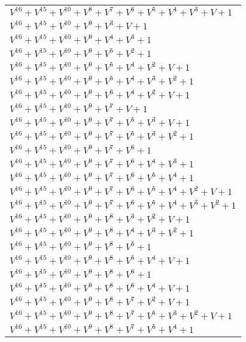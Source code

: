 \documentclass[12pt]{article}
\begin{document}
\begin{adjustwidth}{-4cm}{}
\begin{center}
\begin{longtable}{|l|}
$V^{16}  +V^{15}  +V^{10}  +V^{8}  +V^{7}  +V^{6}  +V^{5}  +V^{4}  +V^{3}  + V + 1$ \\
$V^{16}  +V^{15}  +V^{10}  +V^{9}  +V^{3}  + V + 1$ \\
$V^{16}  +V^{15}  +V^{10}  +V^{9}  +V^{4}  +V^{3}  + 1$ \\
$V^{16}  +V^{15}  +V^{10}  +V^{9}  +V^{5}  +V^{2}  + 1$ \\
$V^{16}  +V^{15}  +V^{10}  +V^{9}  +V^{5}  +V^{4}  +V^{2}  + V + 1$ \\
$V^{16}  +V^{15}  +V^{10}  +V^{9}  +V^{5}  +V^{4}  +V^{3}  +V^{2}  + 1$ \\
$V^{16}  +V^{15}  +V^{10}  +V^{9}  +V^{6}  +V^{4}  +V^{2}  + V + 1$ \\
$V^{16}  +V^{15}  +V^{10}  +V^{9}  +V^{7}  + V + 1$ \\
$V^{16}  +V^{15}  +V^{10}  +V^{9}  +V^{7}  +V^{5}  +V^{3}  + V + 1$ \\
$V^{16}  +V^{15}  +V^{10}  +V^{9}  +V^{7}  +V^{5}  +V^{3}  +V^{2}  + 1$ \\
$V^{16}  +V^{15}  +V^{10}  +V^{9}  +V^{7}  +V^{6}  + 1$ \\
$V^{16}  +V^{15}  +V^{10}  +V^{9}  +V^{7}  +V^{6}  +V^{4}  +V^{3}  + 1$ \\
$V^{16}  +V^{15}  +V^{10}  +V^{9}  +V^{7}  +V^{6}  +V^{5}  +V^{4}  + 1$ \\
$V^{16}  +V^{15}  +V^{10}  +V^{9}  +V^{7}  +V^{6}  +V^{5}  +V^{4}  +V^{2}  + V + 1$ \\
$V^{16}  +V^{15}  +V^{10}  +V^{9}  +V^{7}  +V^{6}  +V^{5}  +V^{4}  +V^{3}  +V^{2}  + 1$ \\
$V^{16}  +V^{15}  +V^{10}  +V^{9}  +V^{8}  +V^{3}  +V^{2}  + V + 1$ \\
$V^{16}  +V^{15}  +V^{10}  +V^{9}  +V^{8}  +V^{4}  +V^{3}  +V^{2}  + 1$ \\
$V^{16}  +V^{15}  +V^{10}  +V^{9}  +V^{8}  +V^{5}  + 1$ \\
$V^{16}  +V^{15}  +V^{10}  +V^{9}  +V^{8}  +V^{5}  +V^{4}  + V + 1$ \\
$V^{16}  +V^{15}  +V^{10}  +V^{9}  +V^{8}  +V^{6}  + 1$ \\
$V^{16}  +V^{15}  +V^{10}  +V^{9}  +V^{8}  +V^{6}  +V^{4}  + V + 1$ \\
$V^{16}  +V^{15}  +V^{10}  +V^{9}  +V^{8}  +V^{7}  +V^{2}  + V + 1$ \\
$V^{16}  +V^{15}  +V^{10}  +V^{9}  +V^{8}  +V^{7}  +V^{5}  +V^{3}  +V^{2}  + V + 1$ \\
$V^{16}  +V^{15}  +V^{10}  +V^{9}  +V^{8}  +V^{7}  +V^{5}  +V^{4}  + 1$ \\

\end{longtable}
\end{center}
\end{adjustwidth}
\end{document}
